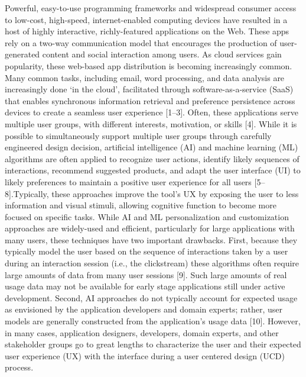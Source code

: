 \documentclass[]{article}
\begin{document}
Powerful, easy-to-use programming frameworks and widespread consumer
access to low-cost, high-speed, internet-enabled computing devices have
resulted in a host of highly interactive, richly-featured applications
on the Web. These apps rely on a two-way communication model that
encourages the production of user-generated content and social
interaction among users. As cloud services gain popularity, these
web-based app distribution is becoming increasingly common. Many common
tasks, including email, word processing, and data analysis are
increasingly done `in the cloud', facilitated through
software-as-a-service (SaaS) that enables synchronous information
retrieval and preference persistence across devices to create a seamless
user experience {[}1--3{]}. Often, these applications serve multiple
user groups, with different interests, motivation, or skills {[}4{]}.
While it is possible to simultaneously support multiple user groups
through carefully engineered design decision, artificial intelligence
(AI) and machine learning (ML) algorithms are often applied to recognize
user actions, identify likely sequences of interactions, recommend
suggested products, and adapt the user interface (UI) to likely
preferences to maintain a positive user experience for all users
{[}5--8{]}.Typically, these approaches improve the tool's UX by exposing
the user to less information and visual stimuli, allowing cognitive
function to become more focused on specific tasks. While AI and ML
personalization and customization approaches are widely-used and
efficient, particularly for large applications with many users, these
techniques have two important drawbacks. First, because they typically
model the user based on the sequence of interactions taken by a user
during an interaction session (i.e., the clickstream) these algorithms
often require large amounts of data from many user sessions {[}9{]}.
Such large amounts of real usage data may not be available for early
stage applications still under active development. Second, AI approaches
do not typically account for expected usage as envisioned by the
application developers and domain experts; rather, user models are
generally constructed from the application's usage data {[}10{]}.
However, in many cases, application designers, developers, domain
experts, and other stakeholder groups go to great lengths to
characterize the user and their expected user experience (UX) with the
interface during a user centered design (UCD) process.
\end{document}
